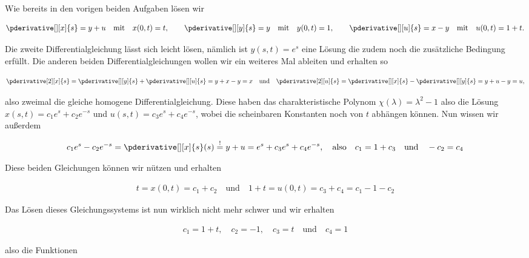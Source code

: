 \begin{solution}

Wie bereits in den vorigen beiden Aufgaben lösen wir

\begin{align*}
    \pderivative[][x]{s} = y + u \quad \text{mit} \quad x(0,t) = t, \qquad
    \pderivative[][y]{s} = y \quad \text{mit} \quad y(0,t) = 1, \qquad
    \pderivative[][u]{s} = x - y \quad \text{mit} \quad u(0,t) = 1 + t .
\end{align*}

Die zweite Differentialgleichung lässt sich leicht lösen, nämlich ist $y(s,t) = e^s$ eine Lösung die zudem noch die zusätzliche Bedingung erfüllt. Die anderen beiden Differentialgleichungen wollen wir ein weiteres Mal ableiten und erhalten so

\begin{align*}
    \pderivative[2][x]{s} = \pderivative[][y]{s} + \pderivative[][u]{s} = y  + x - y = x \quad \text{und} \quad \pderivative[2][u]{s} = \pderivative[][x]{s} - \pderivative[][y]{s} = y + u - y = u,
\end{align*}

also zweimal die gleiche homogene Differentialgleichung. Diese haben das charakteristische Polynom $\chi(\lambda) = \lambda^2 -1$ also die Lösung $x(s,t) = c_1 e^s + c_2 e^{-s}$ und $u(s,t) = c_3 e^s + c_4 e^{-s}$, wobei die scheinbaren Konstanten noch von $t$ abhängen können. Nun wissen wir außerdem 

\begin{align*}
    c_1 e^s - c_2 e^{-s} = \pderivative[][x]{s}(s)\stackrel{!}{=} y + u = e^s + c_3 e^s + c_4 e^{-s}, \quad \text{also} \quad c_1 = 1 + c_3 \quad \text{und} \quad -c_2 = c_4 
\end{align*}

Diese beiden Gleichungen können wir nützen und erhalten 

\begin{align*}
    t = x(0,t) = c_1 + c_2 \quad \text{und} \quad 1 + t = u(0,t) = c_3 + c_4 = c_1 - 1 - c_2
\end{align*}

Das Lösen dieses Gleichungssystems ist nun wirklich nicht mehr schwer und wir erhalten

\begin{align*}
    c_1 = 1 + t, \quad c_2 = -1, \quad c_3 = t \quad \text{und} \quad c_4 = 1
\end{align*}

also die Funktionen


\end{solution}

